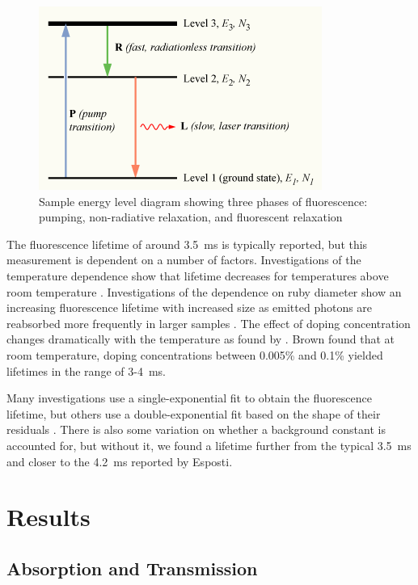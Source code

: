 \documentclass[11pt, a4paper, twocolumn]{article}
\begin{document}
\begin{figure}
\includegraphics[width=\linewidth]{Population-inversion-3level.png}
\caption{Sample energy level diagram showing three phases of fluorescence: pumping, non-radiative relaxation, and fluorescent relaxation}
\label{fig:populationInversion}
\end{figure}

The fluorescence lifetime of around \SI{3.5}{\ms} is typically reported, but this measurement is dependent on a number of factors. Investigations of the temperature dependence show that lifetime decreases for temperatures above room temperature \cite{Seat, Nelson}. Investigations of the dependence on ruby diameter show an increasing fluorescence lifetime with increased size as emitted photons are reabsorbed more frequently in larger samples \cite{Jones}. The effect of doping concentration changes dramatically with the temperature as found by \cite{Brown}. Brown found that at room temperature, doping concentrations between 0.005\% and 0.1\% yielded lifetimes in the range of 3-\SI{4}{\ms}.

Many investigations use a single-exponential fit to obtain the fluorescence lifetime, but others use a double-exponential fit based on the shape of their residuals \cite{McBane, Jones}. There is also some variation on whether a background constant is accounted for, but without it, we found a lifetime further from the typical \SI{3.5}{\ms} and closer to the \SI{4.2}{\ms} reported by Esposti.
\section*{Results}
\subsection*{Absorption and Transmission}
\end{document}
